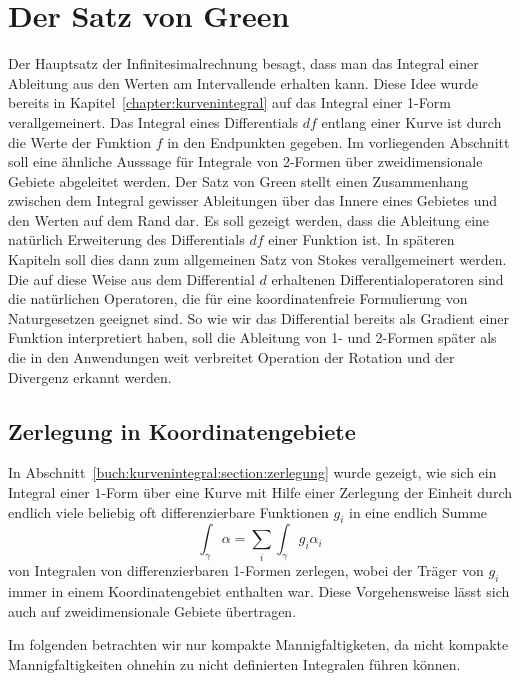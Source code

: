 %
%
\section{Der Satz von Green
\label{buch:green:section:green}}
Der Hauptsatz der Infinitesimalrechnung besagt, dass man das Integral
einer Ableitung aus den Werten am Intervallende erhalten kann.
Diese Idee wurde bereits in Kapitel~\ref{chapter:kurvenintegral} auf
das Integral einer 1-Form verallgemeinert.
Das Integral eines Differentials $df$ entlang einer Kurve ist durch
die Werte der Funktion $f$ in den Endpunkten gegeben.
Im vorliegenden Abschnitt soll eine ähnliche Ausssage für Integrale
von 2-Formen über zweidimensionale Gebiete abgeleitet werden.
Der Satz von Green stellt einen Zusammenhang zwischen dem Integral
gewisser Ableitungen über das Innere eines Gebietes und den Werten
auf dem Rand dar.
Es soll gezeigt werden, dass die Ableitung eine natürlich Erweiterung
des Differentials $df$ einer Funktion ist.
In späteren Kapiteln soll dies dann zum allgemeinen Satz von Stokes
verallgemeinert werden.
Die auf diese Weise aus dem Differential $d$ erhaltenen
Differentialoperatoren sind die natürlichen Operatoren, die für
eine koordinatenfreie Formulierung von Naturgesetzen geeignet sind.
So wie wir das Differential bereits als Gradient einer Funktion
interpretiert haben, soll die Ableitung von 1- und 2-Formen später
als die in den Anwendungen weit verbreitet Operation der Rotation
und der Divergenz erkannt werden.

%
%
\subsection{Zerlegung in Koordinatengebiete
\label{buch:green:satzvongreen:subsection:zerlegung}}
In Abschnitt~\ref{buch:kurvenintegral:section:zerlegung} wurde gezeigt,
wie sich ein Integral einer $1$-Form über eine Kurve mit Hilfe einer
Zerlegung der Einheit durch endlich viele beliebig oft differenzierbare
Funktionen $g_i$ in eine endlich Summe
\[
\int_{\gamma} \alpha = \sum_i \int_{\gamma} g_i\alpha_i
\]
von Integralen von differenzierbaren 1-Formen zerlegen, wobei der
Träger von $g_i$ immer in einem Koordinatengebiet enthalten war.
Diese Vorgehensweise lässt sich auch auf zweidimensionale Gebiete
übertragen.

Im folgenden betrachten wir nur kompakte Mannigfaltigketen, da nicht
kompakte Mannigfaltigkeiten ohnehin zu nicht definierten Integralen
führen können.

